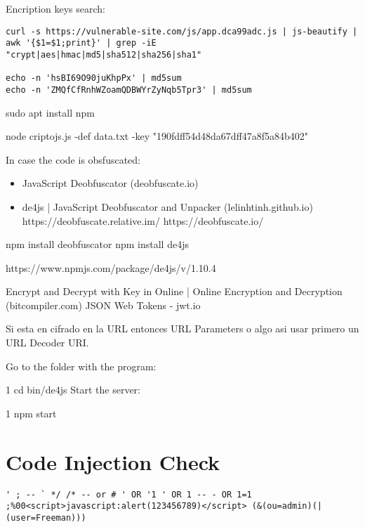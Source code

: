 Encription keys search:
\begin{lstlisting}[numbers=none]
curl -s https://vulnerable-site.com/js/app.dca99adc.js | js-beautify | awk '{$1=$1;print}' | grep -iE  "crypt|aes|hmac|md5|sha512|sha256|sha1"

echo -n 'hsBI69O90juKhpPx' | md5sum 
echo -n 'ZMQfCfRnhWZoamQDBWYrZyNqb5Tpr3' | md5sum
\end{lstlisting}

sudo apt install npm 


node criptojs.js -def data.txt -key "190fdff54d48da67dff47a8f5a84b402"

In case the code is obsfuscated:
\begin{itemize}
	\item JavaScript Deobfuscator (deobfuscate.io)
	\item de4js | JavaScript Deobfuscator and Unpacker (lelinhtinh.github.io)
		https://deobfuscate.relative.im/
         	https://deobfuscate.io/
\end{itemize}

npm install deobfuscator
npm install de4js

https://www.npmjs.com/package/de4js/v/1.10.4

Encrypt and Decrypt with Key in Online | Online Encryption and Decryption (bitcompiler.com)
JSON Web Tokens - jwt.io

Si esta en cifrado en la URL entonces URL Parameters o algo asi usar primero un URL Decoder URI.

Go to the folder with the program:

1
cd bin/de4js
Start the server:

1
npm start

\section{Code Injection Check}

\begin{lstlisting}[numbers=none]
' ; -- ` */ /* -- or # ' OR '1 ' OR 1 -- - OR 1=1 ;%00<script>javascript:alert(123456789)</script> (&(ou=admin)(| (user=Freeman)))
\end{lstlisting}

